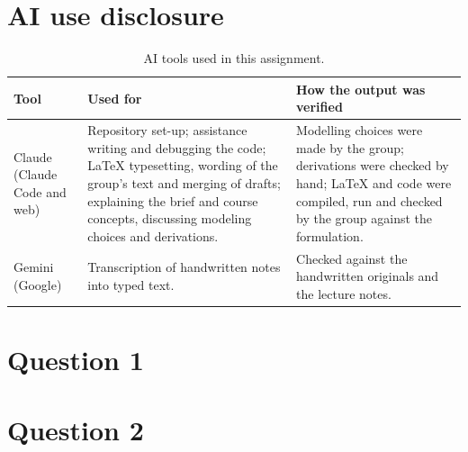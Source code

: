 \documentclass[12pt,oneside,a4paper,english]{article}
\begin{document}
\section*{AI use disclosure}
\begin{table}[H]
  \centering
  \begin{tabularx}{\textwidth}{lXX}
    \toprule
    \textbf{Tool} & \textbf{Used for} & \textbf{How the output was verified} \\
    \midrule
        Claude (Claude Code and web)
    &
    Repository set-up; assistance writing and debugging the code; LaTeX typesetting, wording of
    the group's text and merging of drafts; explaining the brief and course concepts,
    discussing modeling choices and derivations.
    &
    Modelling choices were made by the group; derivations were checked by hand; LaTeX and code
    were compiled, run and checked by the group against the formulation.
    \\
    \midrule
    Gemini (Google)
    &
    Transcription of handwritten notes into typed text.
    &
    Checked against the handwritten originals and the lecture notes.
    \\
    \bottomrule
  \end{tabularx}
  \caption{AI tools used in this assignment.}
  \label{tab:ai}
\end{table}

\newpage 
{} 



\newpage


\newpage
\section{Question 1}


\newpage
\section{Question 2}

\end{document}
